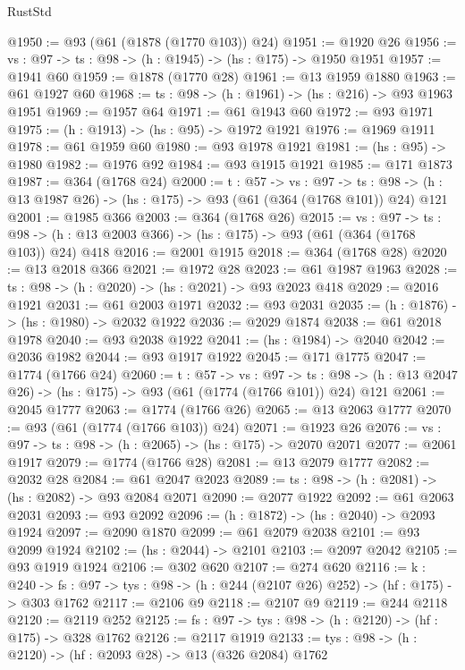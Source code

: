 \begin{lexlean}{RustStd}
\begin{coremodule}
{\begin{coremodule}
{{{{{{@1950 := @93 (@61 (@1878 (@1770 @103)) @24)
@1951 := @1920 @26
@1956 := {vs : @97} -> {ts : @98} -> (h : @1945) -> (hs : @175) -> @1950 @1951
@1957 := @1941 @60
@1959 := @1878 (@1770 @28)
@1961 := @13 @1959 @1880
@1963 := @61 @1927 @60
@1968 := {ts : @98} -> (h : @1961) -> (hs : @216) -> @93 @1963 @1951
@1969 := @1957 @64
@1971 := @61 @1943 @60
@1972 := @93 @1971
@1975 := (h : @1913) -> (hs : @95) -> @1972 @1921
@1976 := @1969 @1911
@1978 := @61 @1959 @60
@1980 := @93 @1978 @1921
@1981 := (hs : @95) -> @1980
@1982 := @1976 @92
@1984 := @93 @1915 @1921
@1985 := @171 @1873
@1987 := @364 (@1768 @24)
@2000 := {t : @57} ->
  {vs : @97} ->
  {ts : @98} -> (h : @13 @1987 @26) -> (hs : @175) -> @93 (@61 (@364 (@1768 @101)) @24) @121
@2001 := @1985 @366
@2003 := @364 (@1768 @26)
@2015 := {vs : @97} ->
  {ts : @98} -> (h : @13 @2003 @366) -> (hs : @175) -> @93 (@61 (@364 (@1768 @103)) @24) @418
@2016 := @2001 @1915
@2018 := @364 (@1768 @28)
@2020 := @13 @2018 @366
@2021 := @1972 @28
@2023 := @61 @1987 @1963
@2028 := {ts : @98} -> (h : @2020) -> (hs : @2021) -> @93 @2023 @418
@2029 := @2016 @1921
@2031 := @61 @2003 @1971
@2032 := @93 @2031
@2035 := (h : @1876) -> (hs : @1980) -> @2032 @1922
@2036 := @2029 @1874
@2038 := @61 @2018 @1978
@2040 := @93 @2038 @1922
@2041 := (hs : @1984) -> @2040
@2042 := @2036 @1982
@2044 := @93 @1917 @1922
@2045 := @171 @1775
@2047 := @1774 (@1766 @24)
@2060 := {t : @57} ->
  {vs : @97} ->
  {ts : @98} -> (h : @13 @2047 @26) -> (hs : @175) -> @93 (@61 (@1774 (@1766 @101)) @24) @121
@2061 := @2045 @1777
@2063 := @1774 (@1766 @26)
@2065 := @13 @2063 @1777
@2070 := @93 (@61 (@1774 (@1766 @103)) @24)
@2071 := @1923 @26
@2076 := {vs : @97} -> {ts : @98} -> (h : @2065) -> (hs : @175) -> @2070 @2071
@2077 := @2061 @1917
@2079 := @1774 (@1766 @28)
@2081 := @13 @2079 @1777
@2082 := @2032 @28
@2084 := @61 @2047 @2023
@2089 := {ts : @98} -> (h : @2081) -> (hs : @2082) -> @93 @2084 @2071
@2090 := @2077 @1922
@2092 := @61 @2063 @2031
@2093 := @93 @2092
@2096 := (h : @1872) -> (hs : @2040) -> @2093 @1924
@2097 := @2090 @1870
@2099 := @61 @2079 @2038
@2101 := @93 @2099 @1924
@2102 := (hs : @2044) -> @2101
@2103 := @2097 @2042
@2105 := @93 @1919 @1924
@2106 := @302 @620
@2107 := @274 @620
@2116 := {k : @240} ->
  {fs : @97} -> {tys : @98} -> (h : @244 (@2107 @26) @252) -> (hf : @175) -> @303 @1762
@2117 := @2106 @9
@2118 := @2107 @9
@2119 := @244 @2118
@2120 := @2119 @252
@2125 := {fs : @97} -> {tys : @98} -> (h : @2120) -> (hf : @175) -> @328 @1762
@2126 := @2117 @1919
@2133 := {tys : @98} -> (h : @2120) -> (hf : @2093 @28) -> @13 (@326 @2084) @1762
}}}}}}
\end{coremodule}}
\end{coremodule}
\end{lexlean}
